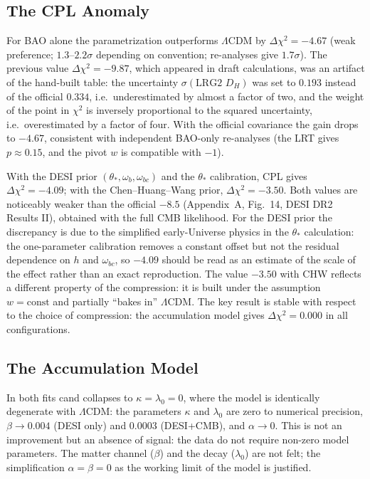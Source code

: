 \documentclass[11pt,a4paper]{article}
\begin{document}
\subsection{The CPL Anomaly}
For BAO alone the parametrization outperforms $\Lambda$CDM by $\Delta\chi^2=-4.67$ (weak preference; $1.3$--$2.2\sigma$ depending on convention; re-analyses give $1.7\sigma$). The previous value $\Delta\chi^2=-9.87$, which appeared in draft calculations, was an artifact of the hand-built table: the uncertainty $\sigma(\text{LRG2 }D_H)$ was set to $0.193$ instead of the official $0.334$, i.e.\ underestimated by almost a factor of two, and the weight of the point in $\chi^2$ is inversely proportional to the squared uncertainty, i.e.\ overestimated by a factor of four. With the official covariance the gain drops to $-4.67$, consistent with independent BAO-only re-analyses (the LRT gives $p\approx0.15$, and the pivot $w$ is compatible with $-1$).

With the DESI prior $(\theta_*,\omega_b,\omega_{bc})$ and the $\theta_*$ calibration, CPL gives $\Delta\chi^2=-4.09$; with the Chen--Huang--Wang prior, $\Delta\chi^2=-3.50$. Both values are noticeably weaker than the official $-8.5$ (Appendix~A, Fig.~14, DESI DR2 Results II), obtained with the full CMB likelihood. For the DESI prior the discrepancy is due to the simplified early-Universe physics in the $\theta_*$ calculation: the one-parameter calibration removes a constant offset but not the residual dependence on $h$ and $\omega_{bc}$, so $-4.09$ should be read as an estimate of the scale of the effect rather than an exact reproduction. The value $-3.50$ with CHW reflects a different property of the compression: it is built under the assumption $w=\mathrm{const}$ and partially ``bakes in'' $\Lambda$CDM. The key result is stable with respect to the choice of compression: the accumulation model gives $\Delta\chi^2=0.000$ in all configurations.

\subsection{The Accumulation Model}
In both fits cand collapses to $\kappa=\lambda_0=0$, where the model is identically degenerate with $\Lambda$CDM: the parameters $\kappa$ and $\lambda_0$ are zero to numerical precision, $\beta\to0.004$ (DESI only) and $0.0003$ (DESI+CMB), and $\alpha\to0$. This is not an improvement but an absence of signal: the data do not require non-zero model parameters. The matter channel ($\beta$) and the decay ($\lambda_0$) are not felt; the simplification $\alpha=\beta=0$ as the working limit of the model is justified.
\end{document}
